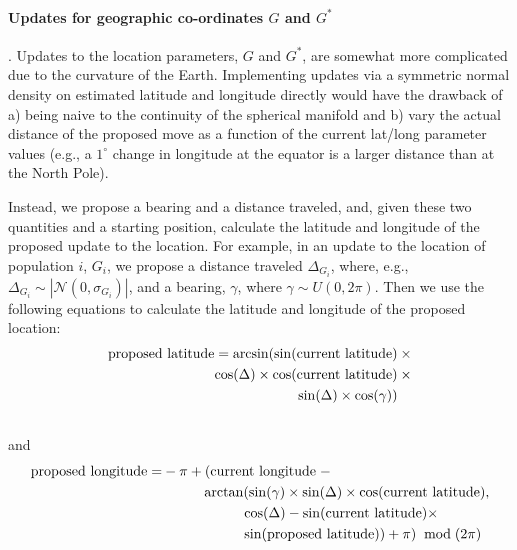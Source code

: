 \documentclass[12pt]{article}
\newcommand{\identifyadmixsource}[1]{{#1^{*}}}
\begin{document}
\paragraph{Updates for geographic co-ordinates $G$ and $\identifyadmixsource{G}$}. Updates to the location parameters, $G$ and $\identifyadmixsource{G}$, are somewhat more complicated due to the curvature of the Earth.  Implementing updates via a symmetric normal density on estimated latitude and longitude directly would have the drawback of a) being naive to the continuity of the spherical manifold and b) vary the actual distance of the proposed move as a function of the current lat/long parameter values (e.g., a $1^{\circ}$ change in longitude at the equator is a larger distance than at the North Pole).  

Instead, we propose a bearing and a distance traveled, and, given these two quantities and a starting position, calculate the latitude and longitude of the proposed update to the location.  For example, in an update to the location of population $i$, $G_i$, we propose a distance traveled $\Delta_{{G}_i}$, where, e.g., $\Delta_{G_i}  \sim | \mathcal{N}(0,\sigma_{{G}_i})|$, and a bearing, $\gamma$, where $\gamma \sim U(0,2\pi)$.  Then we use the following equations to calculate the latitude and longitude of the proposed location:
\begin{align}
\text{proposed latitude} = \arcsin(\sin(\text{current latitude}) \: &\times\\  \notag
					\cos(\Delta) \times \cos(\text{current latitude}) \:&\times\\  \notag
					\sin(\Delta) \times \cos(\gamma))   \:&\phantom{\times}\\  \notag
\end{align}
and
\begin{align}
\text{proposed longitude} = & - \pi + (\text{current longitude} \; - \\ \notag
					 	&\hspace{1cm} \arctan(
							\sin(\gamma) \times
							\sin(\Delta) \times
							\cos(\text{current latitude}) , \\ \notag
						& \hspace{2cm} \cos(\Delta) - 
							\sin(\text{current latitude}) \times \\ \notag
						& \hspace{2cm} \sin(\text{proposed latitude})) + \pi) \; \bmod (2\pi) \\ \notag
\end{align}
\end{document}
